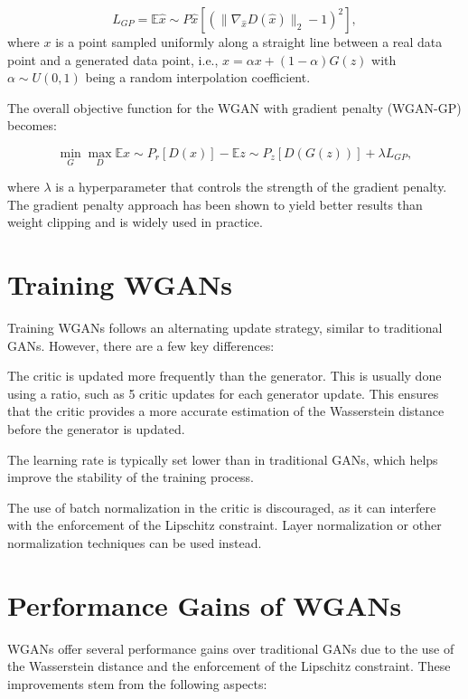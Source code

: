 \begin{equation}
L_{GP} = \mathbb{E}{\hat{x} \sim P{\hat{x}}} [(\lVert \nabla_{\hat{x}} D(\hat{x}) \rVert_2 - 1)^2],
\end{equation}
where $x$ is a point sampled uniformly along a straight line between a real data point and a generated data point, i.e., $x=\alpha x+(1-\alpha)G(z)$ with $\alpha\sim U(0,1)$ being a random interpolation coefficient.

The overall objective function for the WGAN with gradient penalty (WGAN-GP) becomes:

\begin{equation}
\min_{G} \max_{D} \mathbb{E}{x \sim P_r} [D(x)] - \mathbb{E}{z \sim P_z} [D(G(z))] + \lambda L_{GP},
\end{equation}

where $\lambda$ is a hyperparameter that controls the strength of the gradient penalty. The gradient penalty approach has been shown to yield better results than weight clipping and is widely used in practice.

\section{Training WGANs}

Training WGANs follows an alternating update strategy, similar to traditional GANs. However, there are a few key differences:

    The critic is updated more frequently than the generator. This is usually done using a ratio, such as 5 critic updates for each generator update. This ensures that the critic provides a more accurate estimation of the Wasserstein distance before the generator is updated.

    The learning rate is typically set lower than in traditional GANs, which helps improve the stability of the training process.

    The use of batch normalization in the critic is discouraged, as it can interfere with the enforcement of the Lipschitz constraint. Layer normalization or other normalization techniques can be used instead.

\section{Performance Gains of WGANs}

WGANs offer several performance gains over traditional GANs due to the use of the Wasserstein distance and the enforcement of the Lipschitz constraint. These improvements stem from the following aspects:

